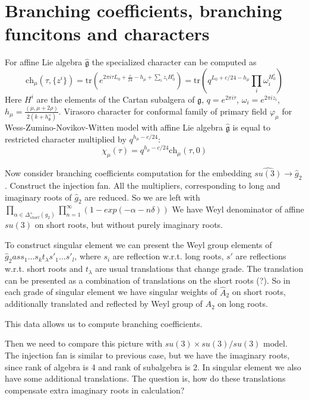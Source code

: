 \documentclass[12pt]{article}
\newcommand{\gf}{\mathfrak{g}}
\newcommand{\gfh}{\hat{\mathfrak{g}}}
\begin{document}
\section{Branching coefficients, branching funcitons and characters}
\label{sec:branch-coeff-branch}

For affine Lie algebra $\gfh$ the specialized character can be computed as
\begin{equation}
  \label{eq:1}
  \mathrm{ch}_{\mu} (\tau, \{z^i \}) = \mathrm{tr}\left( e^{2\pi i \tau L_0
    +\frac{c}{24} - h_{\mu } + \sum_i z_i H^i_0} \right)= \mathrm{tr} \left(
  q^{L_0 +c/24-h_{\mu}} \prod_i \omega_i^{H^i_0}\right)
\end{equation}
Here $H^i$ are the elements of the Cartan subalgera of $\gf$, $q=e^{2\pi i
  \tau}$, $\omega_i = e^{2\pi i z_i}$, $h_{\mu} = \frac{(\mu,\mu+2\rho)}{2(k+h^{\vee}_{\gf})}$. 
Virasoro character for conformal family of primary field $\varphi_{\mu}$ for Wess-Zumino-Novikov-Witten model with affine Lie
algebra $\gfh$ is equal to restricted character multiplied by
$q^{h_{\mu}-c/24}$:
\begin{equation}
  \label{eq:2}
  \chi_{\mu} (\tau) = q^{h_{\mu}-c/24} \mathrm{ch} _\mu (\tau,0)
\end{equation}

Now consider branching coefficients computation for the embedding
$\hat{su(3)}\to \hat g_2$. Construct the injection
fan. All the multipliers, corresponding to long and imaginary roots of
$\hat g_2$ are reduced. So we are left with
$\prod_{\alpha\in \Delta^+_{short} (g_2)}\prod_{n=1}^{\infty}
(1-exp(-\alpha - n\delta))$
We have Weyl denominator of affine $su(3)$ on short roots, but without
purely imaginary roots.

To construct singular element we can present the Weyl group elements
of $\hat g_2 as s_1\dots s_k t_{\lambda} s'_1\dots s'_l$,
where $s_i$ are reflection w.r.t. long roots, $s'$ are reflections w.r.t.
short roots and $t_{\lambda}$ are usual translations
that change grade. The translation can be presented as a combination
of translations on the short roots (?).
So in each grade of singular element we have singular weights of $\hat
A_2$ on short roots, additionally
translated and reflected by Weyl group of $A_2$ on long roots.

This data allows us to compute branching coefficients.

Then we need to compare this picture with $su(3)\times su(3)/su(3)$
model. The injection fan is similar to previous
case, but we have the imaginary roots, since rank of algebra is 4 and
rank of subalgebra is 2.
In singular element we also have some additional translations. The
question is, how do these translations compensate
extra imaginary roots in calculation?
\end{document}

